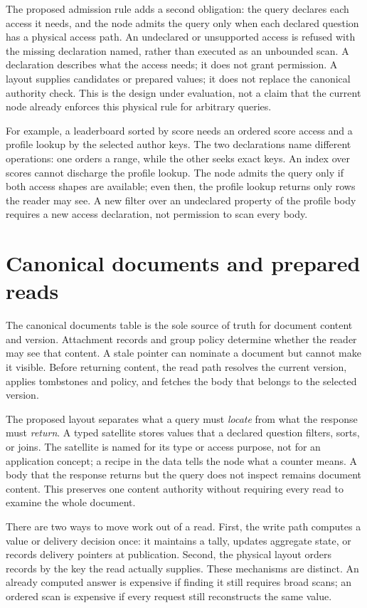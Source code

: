\documentclass[sigconf,nonacm]{acmart}
\begin{document}
The proposed admission rule adds a second obligation: the query declares each access it needs, and the node admits the query only when each declared question has a physical access path. An undeclared or unsupported access is refused with the missing declaration named, rather than executed as an unbounded scan. A declaration describes what the access needs; it does not grant permission. A layout supplies candidates or prepared values; it does not replace the canonical authority check. This is the design under evaluation, not a claim that the current node already enforces this physical rule for arbitrary queries.

For example, a leaderboard sorted by score needs an ordered score access and a profile lookup by the selected author keys. The two declarations name different operations: one orders a range, while the other seeks exact keys. An index over scores cannot discharge the profile lookup. The node admits the query only if both access shapes are available; even then, the profile lookup returns only rows the reader may see. A new filter over an undeclared property of the profile body requires a new access declaration, not permission to scan every body.

\section{Canonical documents and prepared reads}
The canonical documents table is the sole source of truth for document content and version. Attachment records and group policy determine whether the reader may see that content. A stale pointer can nominate a document but cannot make it visible. Before returning content, the read path resolves the current version, applies tombstones and policy, and fetches the body that belongs to the selected version.

The proposed layout separates what a query must \emph{locate} from what the response must \emph{return}. A typed satellite stores values that a declared question filters, sorts, or joins. The satellite is named for its type or access purpose, not for an application concept; a recipe in the data tells the node what a counter means. A body that the response returns but the query does not inspect remains document content. This preserves one content authority without requiring every read to examine the whole document.

There are two ways to move work out of a read. First, the write path computes a value or delivery decision once: it maintains a tally, updates aggregate state, or records delivery pointers at publication. Second, the physical layout orders records by the key the read actually supplies. These mechanisms are distinct. An already computed answer is expensive if finding it still requires broad scans; an ordered scan is expensive if every request still reconstructs the same value.
\end{document}
